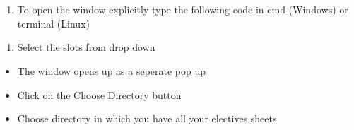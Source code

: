 \documentclass[letterpaper,10pt,english]{sphinxmanual}
\begin{document}


\section{}
\label{\detokenize{user_manual:working-in-gui-2}}

\subsection{}
\label{\detokenize{user_manual:id1}}
\begin{enumerate}
%
\item {} 
To open the window explicitly type the following code in cmd (Windows) or terminal (Linux)

\end{enumerate}

\begin{sphinxVerbatim}[commandchars=\\\{\}]
 
\end{sphinxVerbatim}
\begin{enumerate}
%
\setcounter{enumi}{1}
\item {} 
Select the slots from drop down

\end{enumerate}
\begin{itemize}
\item {} 
The window opens up as a seperate pop up

\end{itemize}

\begin{itemize}
\item {} 
Click on the Choose Directory button

\end{itemize}

\begin{itemize}
\item {} 
Choose directory in which you have all your electives sheets

\end{itemize}
\end{document}
